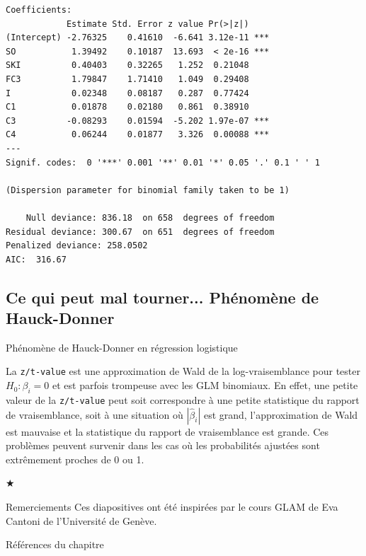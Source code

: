 \documentclass{BeamerTemplate}
\begin{document}
\begin{refsection}
\begin{frame}[fragile]{}
{\begin{verbatim}
Coefficients:
            Estimate Std. Error z value Pr(>|z|)    
(Intercept) -2.76325    0.41610  -6.641 3.12e-11 ***
SO           1.39492    0.10187  13.693  < 2e-16 ***
SKI          0.40403    0.32265   1.252  0.21048    
FC3          1.79847    1.71410   1.049  0.29408    
I            0.02348    0.08187   0.287  0.77424    
C1           0.01878    0.02180   0.861  0.38910    
C3          -0.08293    0.01594  -5.202 1.97e-07 ***
C4           0.06244    0.01877   3.326  0.00088 ***
---
Signif. codes:  0 '***' 0.001 '**' 0.01 '*' 0.05 '.' 0.1 ' ' 1

(Dispersion parameter for binomial family taken to be 1)

    Null deviance: 836.18  on 658  degrees of freedom
Residual deviance: 300.67  on 651  degrees of freedom
Penalized deviance: 258.0502 
AIC:  316.67
\end{verbatim}
}
\end{frame}

\subsection{Ce qui peut mal tourner... Phénomène de Hauck-Donner}
\begin{frame}{Phénomène de Hauck-Donner en régression logistique}

La \texttt{z/t-value} est une approximation de Wald
de la log-vraisemblance pour tester $H_0: \beta_i=0$ et est
parfois trompeuse avec
les GLM binomiaux. En effet, une petite valeur de la \texttt{z/t-value} peut
soit correspondre à une petite statistique du rapport de vraisemblance, soit à une
situation où $|\hat{\beta}_i|$ est grand, l'approximation de Wald
est mauvaise et la statistique du rapport de vraisemblance est grande.
Ces problèmes peuvent survenir dans les cas où les probabilités ajustées sont
extrêmement proches de 0 ou 1.

\bigskip
\bigskip
{\color{red} $\bigstar$ }


\end{frame}

\begin{frame}{Remerciements}
Ces diapositives ont été inspirées par le cours GLAM de Eva Cantoni de l'Université de Genève.
\end{frame}

\begin{frame}[allowframebreaks]{Références du chapitre}
\tiny
\printbibliography[heading=none,section=\therefsection]
\end{frame}

\end{refsection}
\end{document}
